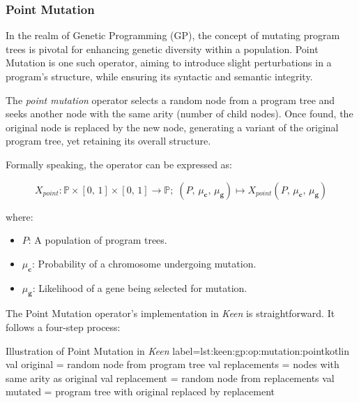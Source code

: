 \subsubsection{Point Mutation}
\label{sec:keen:gp:op:mutation:point}

  In the realm of Genetic Programming (GP), the concept of mutating program trees is pivotal for enhancing genetic diversity within a population. Point Mutation is one such operator, aiming to introduce slight perturbations in a program's structure, while ensuring its syntactic and semantic integrity.

  \begin{definition}
    The \textit{point mutation} operator selects a random node from a program 
    tree and seeks another node with the same arity (number of child nodes). 
    Once found, the original node is replaced by the new node, generating a 
    variant of the original program tree, yet retaining its overall structure.

    Formally speaking, the operator can be expressed as:

    \begin{equation}
      X_{point}: \mathbb{P} \times [0,\, 1] \times [0,\, 1] \to \mathbb{P};\;
        (P,\, \mu_\textbf{c},\, \mu_\textbf{g}) 
        \mapsto X_{point}(P,\, \mu_\textbf{c},\, \mu_\textbf{g})
    \end{equation}

    where:

    \begin{itemize}
      \item \(P\): A population of program trees.
      \item \(\mu_\textbf{c}\): Probability of a chromosome undergoing mutation.
      \item \(\mu_\textbf{g}\): Likelihood of a gene being selected for 
        mutation.
    \end{itemize}
  \end{definition}

  The Point Mutation operator's implementation in \textit{Keen} is straightforward. It follows a four-step process:

  \begin{code}{
    Illustration of Point Mutation in \textit{Keen}
  }{label=lst:keen:gp:op:mutation:point}{kotlin}
    val original = random node from program tree
    val replacements = nodes with same arity as original
    val replacement = random node from replacements
    val mutated = program tree with original replaced by replacement
  \end{code}

